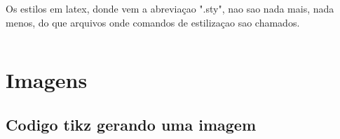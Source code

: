 \documentclass[bigger]{beamer}
\begin{document}
{Os \alert{estilos} em latex, donde vem a abreviaçao ".sty", nao sao nada
mais, nada menos, do que arquivos onde comandos de estilizaçao sao
chamados.

\inputminted[firstline=90,lastline=103, frame=lines,framesep=2mm,baselinestretch=1.2,bgcolor=black,fontsize=\scriptsize]{latex}{./mtheme/beamerouterthememetropolis.sty}


\section{Imagens}
\label{sec:org93b987b}
\subsection{Codigo tikz gerando uma imagem}
\label{sec:org97a019e}
\begin{frame}[label={sec:orgf0a0020},fragile,shrink=0]{}
 \vspace{5mm}


\end{frame}}
\end{document}
